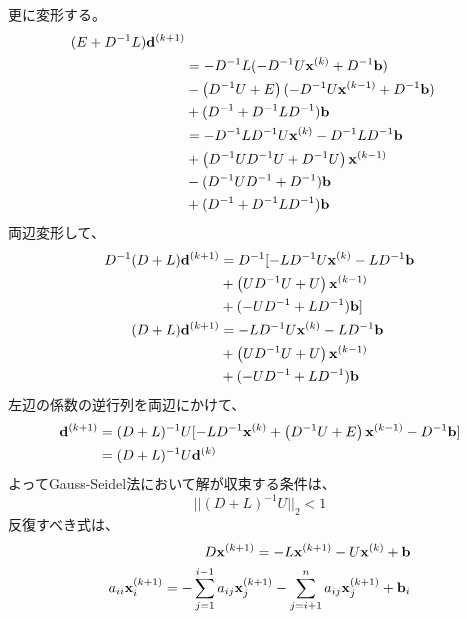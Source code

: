\documentclass{jsarticle}
\newcommand{\kakko}[1][]{(#1)}
\newcommand{\bx}{\bold{x}}
\newcommand{\bb}{\bold{b}}
\newcommand{\bd}{\bold{d}}
\begin{document}
更に変形する。
\begin{align*}
  (E + D^{-1}L)\bd^{\kakko[k+1]} \\ 
& = - D^{-1}L (- D^{-1} U \bx^{\kakko[k]} + D^{-1}\bold{b})\\
&- \left( D^{-1}U+ E\right) (- D^{-1} U \bx^{\kakko[k-1]} + D^{-1}\bold{b})\\
&+ (D^{-1} + D^{-1} L D^{-1}) \bb\\
&=  - D^{-1}L D^{-1} U \bx^{\kakko[k]} - D^{-1}L D^{-1}\bold{b}\\
&+ \left( D^{-1}UD^{-1} U+ D^{-1} U\right)  \bx^{\kakko[k-1]} \\
&-( D^{-1}UD^{-1} + D^{-1})\bold{b}\\
&+ (D^{-1} + D^{-1} L D^{-1})\bb
\end{align*}
両辺変形して、
\begin{align*}
D^{-1}(D + L)\bd^{\kakko[k+1]} &= D^{-1} [-L D^{-1} U \bx^{\kakko[k]} - L D^{-1}\bold{b}\\
&+ \left( UD^{-1} U+ U\right)  \bx^{\kakko[k-1]} \\
&+(-UD^{-1} + LD^{-1})\bold{b}]\\
(D + L)\bd^{\kakko[k+1]}&= - L D^{-1} U \bx^{\kakko[k]} - L D^{-1}\bold{b}\\
&+ \left( UD^{-1} U+ U\right)  \bx^{\kakko[k-1]} \\
& + (-UD^{-1} + LD^{-1})\bold{b}\\
\end{align*}
左辺の係数の逆行列を両辺にかけて、
\begin{align*}
\bd^{\kakko[k+1]} &= (D + L)^{-1}U[- L D^{-1}  \bx^{\kakko[k]} + \left( D^{-1} U+ E\right) \bx^{\kakko[k-1]}
-D^{-1}\bold{b}]\\
&= (D + L)^{-1}U\bd^{\kakko[k]}\\
\end{align*}
よってGauss-Seidel法において解が収束する条件は、
\begin{equation}
    ||(D + L)^{-1}U||_2 < 1
\end{equation}
反復すべき式は、
\begin{align}
    D\bx^{\kakko[k+1]} = - L\bx^{\kakko[k+1]} - U\bx^{\kakko[k]}+\bb\\
    a_{ii}\bx^{\kakko[k+1]}_i =
    - \sum^{i-1}_{j=1} a_{ij}\bx^{\kakko[k+1]}_j- \sum^{n}_{j=i+1}a_{ij}\bx^{\kakko[k+1]}_j+\bb_i
\end{align}
\end{document}
